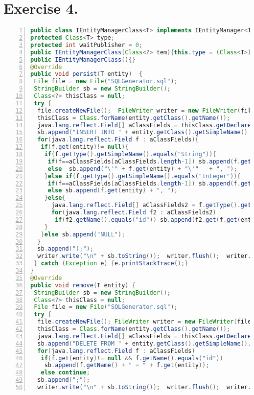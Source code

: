 \documentclass[10pt]{report}
\begin{document}
\section{Exercise 4.}
\label{IEntityMangerClass}
\begin{lstlisting}[numbers=left,language=Java,frame=single,breaklines=true,label=Code:ZeroIn, caption=IEntityManger Class.]
public class IEntityManagerClass<T> implements IEntityManager<T>{
protected Class<T> type;
protected int waitPublisher = 0;
public IEntityManagerClass(Class<?> tem){this.type = (Class<T>) tem;}
public IEntityManagerClass(){}
@Override
public void persist(T entity)  {
 File file = new File("SQLGenerator.sql"); 
 StringBuilder sb = new StringBuilder();
 Class<?> thisClass = null;
 try {
  file.createNewFile();  FileWriter writer = new FileWriter(file,true); 
  thisClass = Class.forName(entity.getClass().getName());
  java.lang.reflect.Field[] aClassFields = thisClass.getDeclaredFields();
  sb.append("INSERT INTO " + entity.getClass().getSimpleName() + " VALUES(");
  for(java.lang.reflect.Field f : aClassFields){
   if(f.get(entity)!= null){
    if(f.getType().getSimpleName().equals("String")){
     if(f==aClassFields[aClassFields.length-1]) sb.append(f.get(entity));
     else  sb.append("\'" + f.get(entity) + "\'"   + ", ");
    }else if(f.getType().getSimpleName().equals("Integer")){
     if(f==aClassFields[aClassFields.length-1]) sb.append(f.get(entity));
     else sb.append(f.get(entity) + ", ");
    }else{
      java.lang.reflect.Field[] aClassFields2 = f.getType().getDeclaredFields();
      for(java.lang.reflect.Field f2 : aClassFields2)
       if(f2.getName().equals("id")) sb.append(f2.get(f.get(entity)));
    }
   }else sb.append("NULL");
  }
  sb.append(");");
  writer.write("\n" + sb.toString());  writer.flush();  writer.close();
 } catch (Exception e) {e.printStackTrace();}	
}
@Override
public void remove(T entity) {
 StringBuilder sb = new StringBuilder();
 Class<?> thisClass = null;
 File file = new File("SQLGenerator.sql");  
 try {
  file.createNewFile(); FileWriter writer = new FileWriter(file,true); 
  thisClass = Class.forName(entity.getClass().getName());
  java.lang.reflect.Field[] aClassFields = thisClass.getDeclaredFields();
  sb.append("DELETE FROM " + entity.getClass().getSimpleName().toLowerCase() + " WHERE ");
  for(java.lang.reflect.Field f : aClassFields)
   if(f.get(entity)!= null && f.getName().equals("id")) 
    sb.append(f.getName() + " = " + f.get(entity));
   else continue;
  sb.append(";");
  writer.write("\n" + sb.toString());  writer.flush();  writer.close();	

\end{lstlisting}
\end{document}
